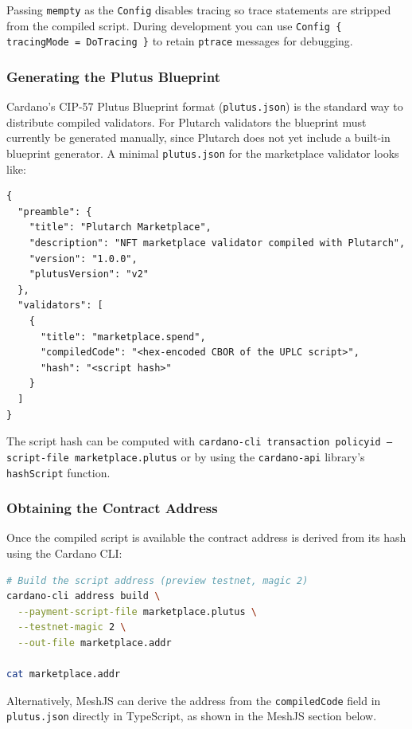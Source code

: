 Passing \texttt{mempty} as the \texttt{Config} disables tracing so trace statements are stripped from the compiled script. During development you can use \texttt{Config \{ tracingMode = DoTracing \}} to retain \texttt{ptrace} messages for debugging.

\subsubsection{Generating the Plutus Blueprint}

Cardano's CIP-57 Plutus Blueprint format (\texttt{plutus.json}) is the standard way to distribute compiled validators. For Plutarch validators the blueprint must currently be generated manually, since Plutarch does not yet include a built-in blueprint generator. A minimal \texttt{plutus.json} for the marketplace validator looks like:

\begin{lstlisting}[language={}, caption=Plutus Blueprint for a Plutarch Validator]
{
  "preamble": {
    "title": "Plutarch Marketplace",
    "description": "NFT marketplace validator compiled with Plutarch",
    "version": "1.0.0",
    "plutusVersion": "v2"
  },
  "validators": [
    {
      "title": "marketplace.spend",
      "compiledCode": "<hex-encoded CBOR of the UPLC script>",
      "hash": "<script hash>"
    }
  ]
}
\end{lstlisting}

The script hash can be computed with \texttt{cardano-cli transaction policyid --script-file marketplace.plutus} or by using the \texttt{cardano-api} library's \texttt{hashScript} function.

\subsubsection{Obtaining the Contract Address}

Once the compiled script is available the contract address is derived from its hash using the Cardano CLI:

\begin{lstlisting}[language=bash, caption=Deriving the Contract Address from a Plutarch Script]
# Build the script address (preview testnet, magic 2)
cardano-cli address build \
  --payment-script-file marketplace.plutus \
  --testnet-magic 2 \
  --out-file marketplace.addr

cat marketplace.addr
\end{lstlisting}

Alternatively, MeshJS can derive the address from the \texttt{compiledCode} field in \texttt{plutus.json} directly in TypeScript, as shown in the MeshJS section below.

